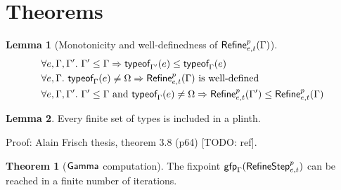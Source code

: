 \documentclass[a4paper]{article}
\theoremstyle{definition}
\newtheorem{theorem}{Theorem}
\newtheorem{lemma}{Lemma}
\begin{document}
  \section{Theorems}

  \begin{lemma}[Monotonicity and well-definedness of $\textsf{Refine}^{p}_{e,t}(\Gamma)$]
    \begin{align*}
      &\forall e,\Gamma,\Gamma'.\ \Gamma'\leq\Gamma \Rightarrow \textsf{typeof}_{\Gamma'}(e) \leq \textsf{typeof}_{\Gamma}(e)\\
      &\forall e,\Gamma.\ \textsf{typeof}_{\Gamma}(e) \neq \Omega \Rightarrow \textsf{Refine}^{p}_{e,t}(\Gamma) \text{ is well-defined}\\
      &\forall e,\Gamma,\Gamma'.\ \Gamma'\leq\Gamma \text{ and } \textsf{typeof}_{\Gamma}(e) \neq \Omega \Rightarrow \textsf{Refine}^{p}_{e,t}(\Gamma') \leq \textsf{Refine}^{p}_{e,t}(\Gamma)\\
    \end{align*}
  \end{lemma}

  \begin{lemma}
    Every finite set of types is included in a plinth.
  \end{lemma}
  Proof: Alain Frisch thesis, theorem 3.8 (p64) [TODO: ref].

  \begin{theorem}[$\textsf{Gamma}_{}$ computation]
    The fixpoint $\textsf{gfp}_\Gamma (\textsf{RefineStep}^{p}_{e,t})$ can be reached in a finite number of iterations.
  \end{theorem}
\end{document}
